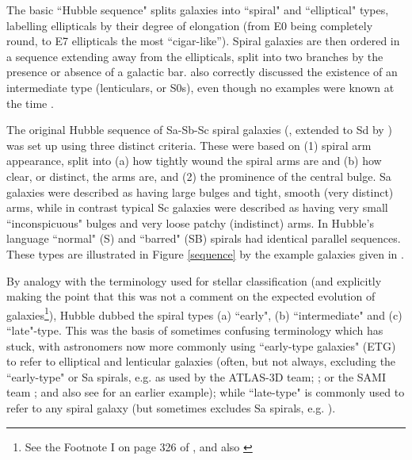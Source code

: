 \documentclass[usenatbib]{mn2e}
\begin{document}
The basic ``Hubble sequence" splits galaxies into ``spiral" and ``elliptical" types, labelling ellipticals by their degree of elongation (from E0 being completely round, to E7 ellipticals the most ``cigar-like''). Spiral galaxies are then ordered in a sequence extending away from the ellipticals, split into two branches by the presence or absence of a galactic bar. 
\citet{Hubble1936} also correctly discussed the existence of an intermediate type (lenticulars, or S0s), even though no examples were known at the time \citep{Buta2013}. 

The original Hubble sequence of Sa-Sb-Sc spiral galaxies (\citealt{Hubble1926}, extended to Sd by \citealt{1959HDP....53..275D}) was set up using three distinct criteria. These were based on (1) spiral arm appearance, split into (a) how tightly wound the spiral arms are and (b) how clear, or distinct, the arms are, and (2) the prominence of the central bulge. Sa galaxies were described as having large bulges and tight, smooth (very distinct) arms, while in contrast typical Sc galaxies were described as having very small ``inconspicuous" bulges and very loose patchy (indistinct) arms. In Hubble's language ``normal" (S) and ``barred" (SB) spirals had identical parallel sequences. These types are illustrated in Figure \ref{sequence} by the example galaxies given in \citet{Hubble1926}. 

By analogy with the terminology used for stellar classification (and explicitly making the point that this was not a comment on the expected evolution of galaxies\footnote{See the Footnote I on page 326 of \citet{Hubble1926}, and also \citet{Baldry2008AG}}), Hubble dubbed the spiral types (a) ``early",  (b) ``intermediate" and (c) ``late"-type. This was the basis of sometimes confusing terminology which has stuck, with astronomers now more commonly using ``early-type galaxies"  (ETG) to refer to elliptical and lenticular galaxies (often, but not always, excluding the ``early-type" or Sa spirals, e.g. as used by the ATLAS-3D team; \citealt{2011MNRAS.413..813C,2011MNRAS.416.1680C}; or the SAMI team \citealt{2018arXiv180711547F}; and also see \citealt{Stanford1998} for an earlier example); while ``late-type" is commonly used to refer to any spiral galaxy (but sometimes excludes Sa spirals, e.g. \citealt{Strateva2001}).
\end{document}

